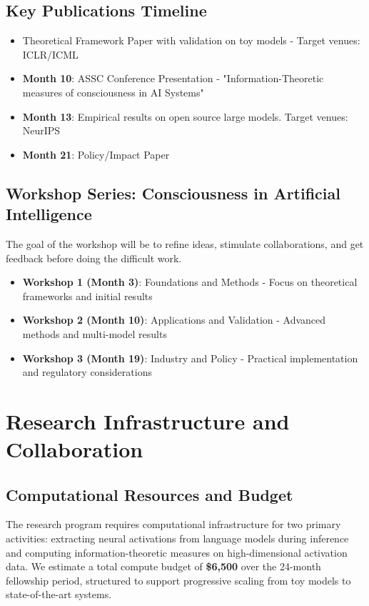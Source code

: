 \documentclass[11pt,a4paper]{article}
\begin{document}
\subsection{Key Publications Timeline}
\begin{itemize}
    \item Theoretical Framework Paper with validation on toy models - Target venues: ICLR/ICML
    \item \textbf{Month 10}: ASSC Conference Presentation - "Information-Theoretic measures of consciousness in AI Systems"
    \item \textbf{Month 13}: Empirical results on open source large models. Target venues: NeurIPS
    \item \textbf{Month 21}: Policy/Impact Paper
\end{itemize}

\subsection{Workshop Series: Consciousness in Artificial Intelligence}
The goal of the workshop will be to refine ideas, stimulate collaborations, and get feedback before doing the difficult work.
\begin{itemize}
    \item \textbf{Workshop 1 (Month 3)}: Foundations and Methods - Focus on theoretical frameworks and initial results
    \item \textbf{Workshop 2 (Month 10)}: Applications and Validation - Advanced methods and multi-model results  
    \item \textbf{Workshop 3 (Month 19)}: Industry and Policy - Practical implementation and regulatory considerations
\end{itemize}
    \section{Research Infrastructure and Collaboration}

    \subsection{Computational Resources and Budget}
    
    The research program requires computational infrastructure for two primary activities: extracting neural activations from language models during inference and computing information-theoretic measures on high-dimensional activation data. We estimate a total compute budget of \textbf{\$6,500} over the 24-month fellowship period, structured to support progressive scaling from toy models to state-of-the-art systems.
    
\end{document}

